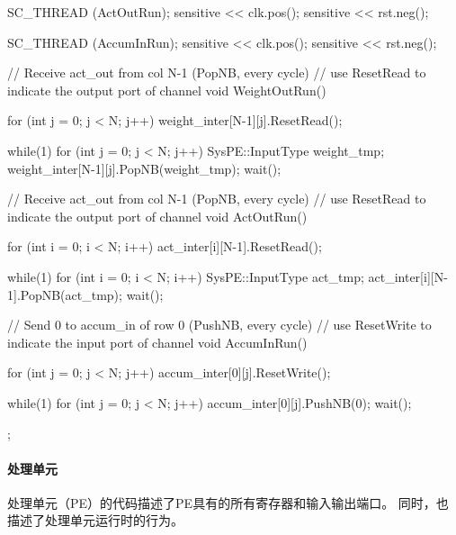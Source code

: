 \begin{codeblock}[language=c++]
{{    SC_THREAD (ActOutRun);
    sensitive << clk.pos();
    sensitive << rst.neg();
    
    SC_THREAD (AccumInRun);
    sensitive << clk.pos();
    sensitive << rst.neg();
  }

  // Receive act\_out from col N-1 (PopNB, every cycle)
  // use ResetRead to indicate the output port of channel
  void WeightOutRun() {
    for (int j = 0; j < N; j++) {
       weight_inter[N-1][j].ResetRead();
    }
    
    while(1) {
      for (int j = 0; j < N; j++) {
        SysPE::InputType weight_tmp; 
        weight_inter[N-1][j].PopNB(weight_tmp);
      }
      wait();
    }
  }

  // Receive act\_out from col N-1 (PopNB, every cycle)
  // use ResetRead to indicate the output port of channel
  void ActOutRun() {
    for (int i = 0; i < N; i++) {
       act_inter[i][N-1].ResetRead();
    }
    
    while(1) {
      for (int i = 0; i < N; i++) {
        SysPE::InputType act_tmp; 
        act_inter[i][N-1].PopNB(act_tmp);
      }
      wait();
    }
  }

  // Send 0 to accum\_in of row 0 (PushNB, every cycle)
  // use ResetWrite to indicate the input port of channel
  void AccumInRun() {
    for (int j = 0; j < N; j++) {
       accum_inter[0][j].ResetWrite();
    }

    while(1) {
      for (int j = 0; j < N; j++) {
        accum_inter[0][j].PushNB(0);
      }
      wait();
    }
  }

};

\end{codeblock}


\paragraph{处理单元}
处理单元（PE）的代码描述了PE具有的所有寄存器和输入输出端口。
同时，也描述了处理单元运行时的行为。

